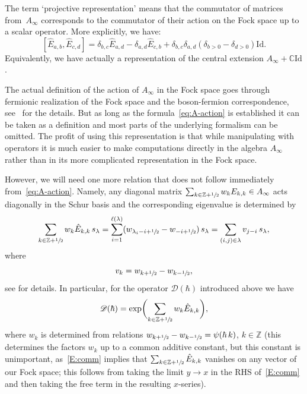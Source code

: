 \documentclass[11pt]{article}
\let\mathcal\mathscr
\newcommand{\C}{\mathbb{C}}
\theoremstyle{plain}
\theoremstyle{definition}
\theoremstyle{remark}
\newcommand{\Z}{\mathbb{Z}}
\begin{document}
The term `projective representation' means that the commutator of matrices from~$A_\infty$ corresponds to the commutator of their action on the Fock space up to a scalar operator. More explicitly, we have:
\begin{equation}
\label{E:comm}
[\hat E_{a,b},\hat E_{c,d}] = \delta_{b,c}\hat E_{a,d} - \delta_{a,d}\hat E_{c,b}+\delta_{b,c}\delta_{a,d}(\delta_{b>0}-\delta_{d>0})\mathrm{Id}.
\end{equation}
Equivalently, we have actually a representation of the central extension $A_{\infty}+\C\mathrm{Id}$.

The actual definition of the action of $A_\infty$ in the Fock space goes through fermionic realization of the Fock space and the boson-fermion correspondence, see~\cite[\S\S5 \&~6]{MiwaJimboDate} for the details. But as long as the formula~\eqref{eq:A-action} is established it can be taken as a definition and most parts of the underlying formalism can be omitted. The profit of using this representation is that while manipulating with operators it is much easier to make computations directly in the algebra $A_\infty$ rather than in its more complicated representation in the Fock space.

However, we will need one more relation that does not follow immediately from~\eqref{eq:A-action}. Namely, any diagonal matrix $\sum_{k\in \Z+\sfrac{1}{2}}w_k E_{k,k}\in A_\infty$ acts diagonally in the Schur basis and the corresponding eigenvalue is determined by
\begin{align}\label{eq:Ewdef}
\sum_{k\in \Z+\sfrac{1}{2}}w_k \hat E_{k,k} \,s_\lambda=\sum_{i=1}^{\ell(\lambda)}(w_{\lambda_i-i+\sfrac12}-w_{-i+\sfrac12})\,s_\lambda=\sum_{(i,j)\in\lambda} v_{j-i}\,s_\lambda,
\end{align}
where
\begin{equation*}
v_k=w_{k+\sfrac12}-w_{k-\sfrac12},
\end{equation*}
see \cite{KazLand} for details. In particular, for the operator $\mathcal{D}(\hbar)$ introduced above we have
\begin{equation*}
\mathcal{D}(\hbar)=\exp\biggl(\sum_{k\in \Z+\sfrac{1}{2}}w_k \hat E_{k,k} \biggr),
\end{equation*}
where $w_k$ is determined from relations $w_{k+\sfrac12}-w_{k-\sfrac12}=\psi(\hbar\,k)$, $k\in\Z$ (this determines the factors $w_k$ up to a common additive constant, but this constant is unimportant, as~\eqref{E:comm} implies that $\sum_{k\in \Z+\sfrac{1}{2}}\hat E_{k,k}$ vanishes on any vector of our Fock space; this follows from taking the limit $y\rightarrow x$ in the RHS of~\eqref{E:comm} and then taking the free term in the resulting $x$-series).
\end{document}
